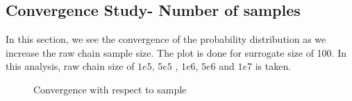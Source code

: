 \subsection{Convergence Study- Number of samples }

 In this section, we see the convergence of the probability distribution as we increase the raw chain sample size. The plot is done for surrogate size of 100. In this analysis, raw chain size of $1e5$, $5e5$ , $1e6$, $5e6$ and $1e7$ is taken.

\begin{figure}[H]
\centering
{}
            \caption{Convergence with respect to sample}
\end{figure}


